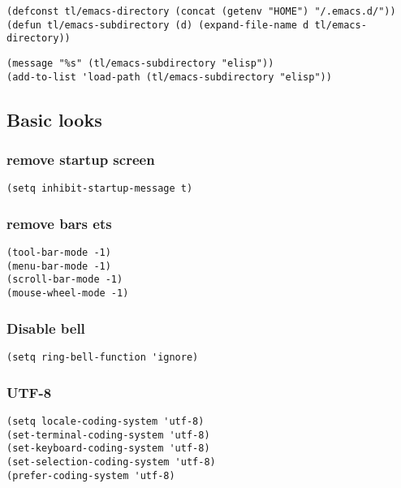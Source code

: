 \documentclass[12pt]{article}
\begin{document}
\begin{verbatim}
(defconst tl/emacs-directory (concat (getenv "HOME") "/.emacs.d/"))
(defun tl/emacs-subdirectory (d) (expand-file-name d tl/emacs-directory))
\end{verbatim}

\begin{verbatim}
(message "%s" (tl/emacs-subdirectory "elisp"))
(add-to-list 'load-path (tl/emacs-subdirectory "elisp"))
\end{verbatim}

\subsection{Basic looks}
\label{sec:org21a0f5f}
\subsubsection{remove startup screen}
\label{sec:org6981c73}
\begin{verbatim}
(setq inhibit-startup-message t) 
\end{verbatim}

\subsubsection{remove bars ets}
\label{sec:org91abcef}
\begin{verbatim}
(tool-bar-mode -1)
(menu-bar-mode -1)
(scroll-bar-mode -1)
(mouse-wheel-mode -1)
\end{verbatim}

\subsubsection{Disable bell}
\label{sec:org7788098}
\begin{verbatim}
(setq ring-bell-function 'ignore)
\end{verbatim}

\subsubsection{UTF-8}
\label{sec:org032637b}

\begin{verbatim}
(setq locale-coding-system 'utf-8)
(set-terminal-coding-system 'utf-8)
(set-keyboard-coding-system 'utf-8)
(set-selection-coding-system 'utf-8)
(prefer-coding-system 'utf-8)
\end{verbatim}
\end{document}
